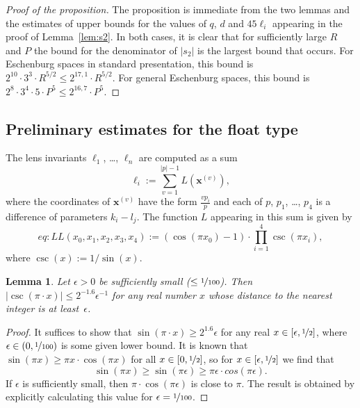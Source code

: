\documentclass{article}
\newtheorem{lem}[thm]{Lemma}
\newcommand{\abs}[1]{\left|#1\right|}
\renewcommand{\vec}[1]{\mathbf{#1}}
\begin{document}
\begin{proof}[Proof of the proposition]
The proposition is immediate from the two lemmas and the estimates of upper bounds for the values of \(q\), \(d\) and \(45\ell_i\) appearing in the proof of Lemma~\ref{lem:s2}.  In both cases, it is clear that for sufficiently large \(R\) and \(P\) the bound for the denominator of \(\abs{s_2}\) is the largest bound that occurs.  For Eschenburg spaces in standard presentation, this bound is 
\(
2^{10}·3^3·R^{5/2} \leq 2^{17,1}·R^{5/2}.
\)
For general Eschenburg spaces, this bound is
\(
    2^{8}·3^4·5·P^{5} \leq 2^{16,7}·P^5
\).
\end{proof}


\subsection{Preliminary estimates for the float type}

The lens invariants \(\ell_1\), \dots, \(\ell_n\) are computed as a sum
\begin{equation}\label{eq:ell}
  \ell_i := \sum_{v=1}^{\abs{p}-1} L(\vec x^{(v)}),
\end{equation}
where the coordinates of \(\vec x^{(v)}\) have the form \(\frac{v p_i}{p}\) and each of \(p\), \(p_1\), \dots, \(p_4\) is a difference of parameters \(k_i-l_j\).  The function \(L\) appearing in this sum is given by 
\begin{equation}{eq:L}
  L(x_0,x_1,x_2,x_3,x_4) 
  := (\cos(\pi x_0)-1)
  · \textstyle\prod_{i=1}^{4} \csc(\pi x_i),
\end{equation}
where \(\csc(x) := 1/\sin(x)\).

\begin{lem}
  Let \(\epsilon>0\) be sufficiently small (\(\leq \nicefrac{1}{100}\)).  Then
  \(\abs{\csc(\pi·x)} \leq 2^{-1.6} \epsilon^{-1}\) for any real number \(x\) whose distance to the nearest integer is at least~\(\epsilon\).
\end{lem}
\begin{proof}
  It suffices to show that \(\sin(\pi·x) \geq 2^{1.6} \epsilon\) for any real \(x\in [\epsilon,\nicefrac{1}{2}]\), where \(\epsilon \in (0,\nicefrac{1}{100})\) is some given lower bound.  It is known that \(\sin(\pi x) \geq \pi x·\cos(\pi x)\) for all \(x\in [0,\nicefrac{1}{2}]\), so for \(x\in [\epsilon,\nicefrac{1}{2}]\) we find that 
  \[
    \sin(\pi x) \geq \sin(\pi\epsilon) \geq \pi\epsilon·cos(\pi\epsilon).
  \]
  If \(\epsilon\) is sufficiently small, then \(\pi·\cos(\pi\epsilon)\) is close to \(\pi\).
  The result is obtained by explicitly calculating this value for \(\epsilon = \nicefrac{1}{100}\).
%
%
\end{proof}
\end{document}

